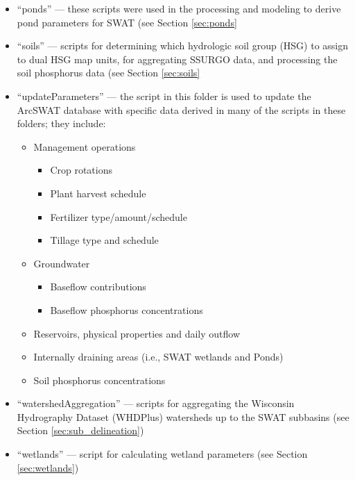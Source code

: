 \begin{itemize}
\item ``ponds'' --- these scripts were used in the processing and modeling to derive pond parameters for SWAT (see Section \ref{sec:ponds} 

\item ``soils'' --- scripts for determining which hydrologic soil group (HSG) to assign to dual HSG map units, for aggregating SSURGO data, and processing the soil phosphorus data  (see Section \ref{sec:soils} 

\item ``updateParameters'' --- the script in this folder is used to update the ArcSWAT database with specific data derived in many of the scripts in these folders; they include:
	\begin{itemize}
	\item Management operations
		\begin{itemize}
		\item Crop rotations
		\item Plant harvest schedule
		\item Fertilizer type/amount/schedule
		\item Tillage type and schedule
		\end{itemize}
	\item Groundwater
		\begin{itemize}
		\item Baseflow contributions
		\item Baseflow phosphorus concentrations 
		\end{itemize}
	\item Reservoirs, physical properties and daily outflow
	\item Internally draining areas (i.e., SWAT wetlands and Ponds)
	\item Soil phosphorus concentrations	
	\end{itemize} 

\item ``watershedAggregation'' --- scripts for aggregating the Wisconsin Hydrography Dataset (WHDPlus) watersheds up to the SWAT subbasins (see Section \ref{sec:sub_delineation})

\item ``wetlands'' --- script for calculating wetland parameters  (see Section \ref{sec:wetlands})

\end{itemize}

